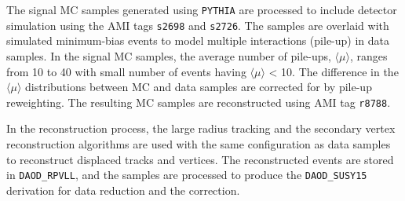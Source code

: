 
The signal MC samples generated using \texttt{PYTHIA} are processed to include detector simulation using the AMI tags \texttt{s2698} and \texttt{s2726}. The samples are overlaid with simulated minimum-bias events to model multiple interactions (pile-up) in data samples. In the signal MC samples, the average number of pile-ups, $\langle\mu\rangle$, ranges from 10 to 40 with small number of events having $\langle\mu\rangle$ < 10. The difference in the $\langle\mu\rangle$ distributions between MC and data samples are corrected for by pile-up reweighting. The resulting MC samples are reconstructed using AMI tag \texttt{r8788}.

In the reconstruction process, the large radius tracking and the secondary vertex reconstruction algorithms are used with the same configuration as data samples to reconstruct displaced tracks and vertices. The reconstructed events are stored in \texttt{DAOD\_RPVLL}, and the samples are processed to produce the \texttt{DAOD\_SUSY15} derivation for data reduction and the correction. 

